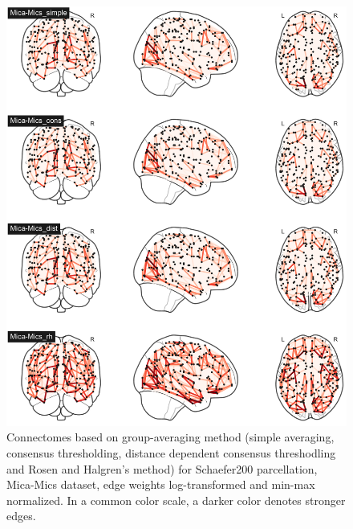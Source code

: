 \begin{figure}[p]
  \begin{center}
    \includegraphics[width=\textwidth]{images/manually_created/mica.png}
  \end{center}
  \caption[Connectomes based on preprocessing method]{Connectomes based on group-averaging method (simple averaging, consensus thresholding, distance dependent consensus threshodling and Rosen and Halgren's method) for Schaefer200 parcellation, Mica-Mics dataset, edge weights log-transformed and min-max normalized. In a common color scale, a darker color denotes stronger edges.}
  \label{fig:connectomes_mica}
\end{figure}


